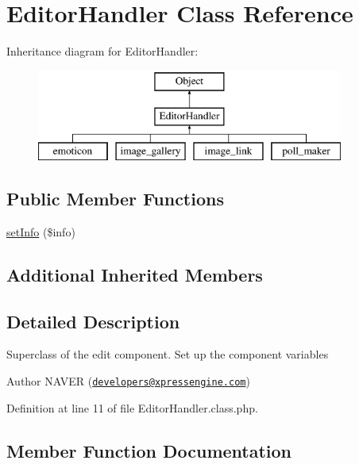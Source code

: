 \hypertarget{classEditorHandler}{}\section{Editor\+Handler Class Reference}
\label{classEditorHandler}
Inheritance diagram for Editor\+Handler\+:\begin{figure}[H]
\begin{center}
\leavevmode
\includegraphics[height=3.000000cm]{classEditorHandler}
\end{center}
\end{figure}
\subsection*{Public Member Functions}
\begin{DoxyCompactItemize}
\item 
\hyperlink{classEditorHandler_af44daebb94e0ce9ca6ff5a792fb52023}{set\+Info} (\$info)
\end{DoxyCompactItemize}
\subsection*{Additional Inherited Members}


\subsection{Detailed Description}
Superclass of the edit component. Set up the component variables

\begin{DoxyAuthor}{Author}
N\+A\+V\+ER (\href{mailto:developers@xpressengine.com}{\tt developers@xpressengine.\+com}) 
\end{DoxyAuthor}


Definition at line 11 of file Editor\+Handler.\+class.\+php.



\subsection{Member Function Documentation}
\hypertarget{classEditorHandler_af44daebb94e0ce9ca6ff5a792fb52023}{}\label{classEditorHandler_af44daebb94e0ce9ca6ff5a792fb52023} 
